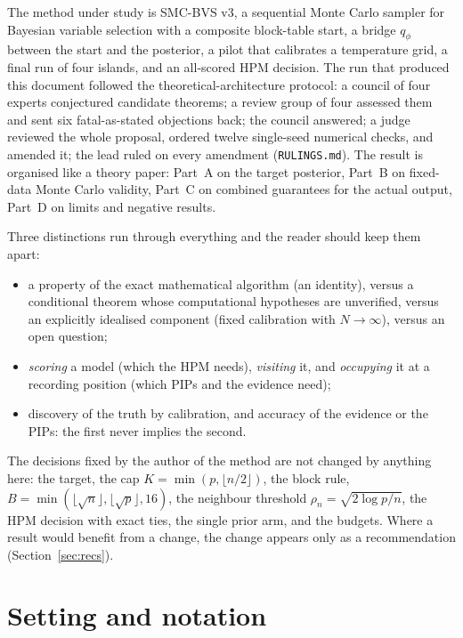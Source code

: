 \documentclass[11pt,a4paper]{article}
\theoremstyle{plain}
\theoremstyle{definition}
\theoremstyle{remark}
\begin{document}
The method under study is SMC-BVS v3, a sequential Monte Carlo sampler for Bayesian variable selection with a composite block-table start, a bridge $q_\phi$ between the start and the posterior, a pilot that calibrates a temperature grid, a final run of four islands, and an all-scored HPM decision. The run that produced this document followed the theoretical-architecture protocol: a council of four experts conjectured candidate theorems; a review group of four assessed them and sent six fatal-as-stated objections back; the council answered; a judge reviewed the whole proposal, ordered twelve single-seed numerical checks, and amended it; the lead ruled on every amendment (\texttt{RULINGS.md}). The result is organised like a theory paper: Part~A on the target posterior, Part~B on fixed-data Monte Carlo validity, Part~C on combined guarantees for the actual output, Part~D on limits and negative results.

Three distinctions run through everything and the reader should keep them apart:
\begin{itemize}
\item a property of the exact mathematical algorithm (an identity), versus a conditional theorem whose computational hypotheses are unverified, versus an explicitly idealised component (fixed calibration with $N\to\infty$), versus an open question;
\item \emph{scoring} a model (which the HPM needs), \emph{visiting} it, and \emph{occupying} it at a recording position (which PIPs and the evidence need);
\item discovery of the truth by calibration, and accuracy of the evidence or the PIPs: the first never implies the second.
\end{itemize}

The decisions fixed by the author of the method are not changed by anything here: the target, the cap $K=\min(p,\lfloor n/2\rfloor)$, the block rule, $B=\min(\lfloor\sqrt n\rfloor,\lfloor\sqrt p\rfloor,16)$, the neighbour threshold $\rho_n=\sqrt{2\log p/n}$, the HPM decision with exact ties, the single prior arm, and the budgets. Where a result would benefit from a change, the change appears only as a recommendation (Section~\ref{sec:recs}).

\section{Setting and notation}\label{sec:setting}
\end{document}
